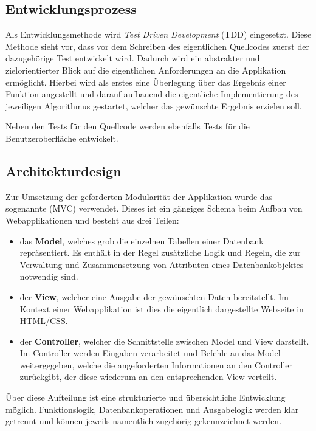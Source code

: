 \subsection{Entwicklungsprozess}
\label{sec:Entwicklungsprozess}
Als Entwicklungsmethode wird \textit{Test Driven Development} (\acs{TDD}) eingesetzt. Diese Methode
sieht vor, dass vor dem Schreiben des eigentlichen Quellcodes zuerst der
dazugehörige Test entwickelt wird. Dadurch wird ein abstrakter und
zielorientierter Blick auf die eigentlichen Anforderungen an die Applikation ermöglicht.
Hierbei wird als erstes eine Überlegung über das Ergebnis einer Funktion angestellt und darauf
aufbauend die eigentliche Implementierung des jeweiligen Algorithmus gestartet, welcher das gewünschte
Ergebnis erzielen soll.

Neben den Tests für den Quellcode werden ebenfalls Tests für die Benutzeroberfläche entwickelt.

\subsection{Architekturdesign}
\label{sec:Architekturdesign}
Zur Umsetzung der geforderten Modularität der Applikation wurde das sogenannte
 (\acs{MVC}) verwendet. Dieses ist ein gängiges Schema beim Aufbau von
Webapplikationen und besteht aus drei Teilen:
\begin{itemize}
	\item das \textbf{Model}, welches grob die einzelnen Tabellen einer Datenbank repräsentiert. Es enthält in
	der Regel zusätzliche Logik und Regeln, die zur Verwaltung und Zusammensetzung von Attributen
	eines Datenbankobjektes notwendig sind.
	\item der \textbf{View}, welcher eine Ausgabe der gewünschten Daten bereitstellt. Im Kontext einer
	Webapplikation ist dies die eigentlich dargestellte Webseite in \acs{HTML}/\acs{CSS}.
	\item der \textbf{Controller}, welcher die Schnittstelle zwischen Model und View darstellt.
	Im Controller werden Eingaben verarbeitet und Befehle an das Model weitergegeben, welche
	die angeforderten Informationen an den Controller zurückgibt, der diese wiederum an den
	entsprechenden View verteilt.
\end{itemize}
Über diese Aufteilung ist eine strukturierte und übersichtliche Entwicklung möglich. Funktionslogik,
Datenbankoperationen und Ausgabelogik werden klar getrennt und können jeweils namentlich zugehörig
gekennzeichnet werden.

